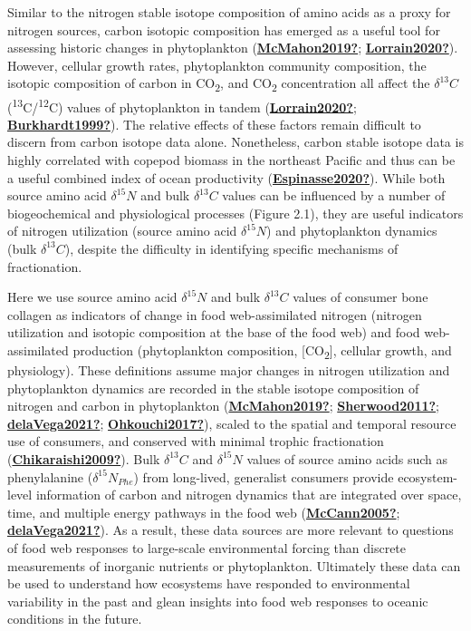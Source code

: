 \documentclass [11pt, proquest] {uwthesis}[2015/03/03]
\begin{document}
Similar to the nitrogen stable isotope composition of amino acids as a proxy for nitrogen sources, carbon isotopic composition has emerged as a useful tool for assessing historic changes in phytoplankton (\protect\hyperlink{ref-McMahon2019}{\textbf{McMahon2019?}}; \protect\hyperlink{ref-Lorrain2020}{\textbf{Lorrain2020?}}). However, cellular growth rates, phytoplankton community composition, the isotopic composition of carbon in CO\textsubscript{2}, and CO\textsubscript{2} concentration all affect the \(\delta^{13}C\) (\textsuperscript{13}C/\textsuperscript{12}C) values of phytoplankton in tandem (\protect\hyperlink{ref-Lorrain2020}{\textbf{Lorrain2020?}}; \protect\hyperlink{ref-Burkhardt1999}{\textbf{Burkhardt1999?}}). The relative effects of these factors remain difficult to discern from carbon isotope data alone. Nonetheless, carbon stable isotope data is highly correlated with copepod biomass in the northeast Pacific and thus can be a useful combined index of ocean productivity (\protect\hyperlink{ref-Espinasse2020}{\textbf{Espinasse2020?}}). While both source amino acid \(\delta^{15}N\) and bulk \(\delta^{13}C\) values can be influenced by a number of biogeochemical and physiological processes (Figure 2.1), they are useful indicators of nitrogen utilization (source amino acid \(\delta^{15}N\)) and phytoplankton dynamics (bulk \(\delta^{13}C\)), despite the difficulty in identifying specific mechanisms of fractionation.

Here we use source amino acid \(\delta^{15}N\) and bulk \(\delta^{13}C\) values of consumer bone collagen as indicators of change in food web-assimilated nitrogen (nitrogen utilization and isotopic composition at the base of the food web) and food web-assimilated production (phytoplankton composition, {[}CO\textsubscript{2}{]}, cellular growth, and physiology). These definitions assume major changes in nitrogen utilization and phytoplankton dynamics are recorded in the stable isotope composition of nitrogen and carbon in phytoplankton (\protect\hyperlink{ref-McMahon2019}{\textbf{McMahon2019?}}; \protect\hyperlink{ref-Sherwood2011}{\textbf{Sherwood2011?}}; \protect\hyperlink{ref-delaVega2021}{\textbf{delaVega2021?}}; \protect\hyperlink{ref-Ohkouchi2017}{\textbf{Ohkouchi2017?}}), scaled to the spatial and temporal resource use of consumers, and conserved with minimal trophic fractionation (\protect\hyperlink{ref-Chikaraishi2009}{\textbf{Chikaraishi2009?}}). Bulk \(\delta^{13}C\) and \(\delta^{15}N\) values of source amino acids such as phenylalanine (\(\delta^{15}N_{Phe}\)) from long-lived, generalist consumers provide ecosystem-level information of carbon and nitrogen dynamics that are integrated over space, time, and multiple energy pathways in the food web (\protect\hyperlink{ref-McCann2005}{\textbf{McCann2005?}}; \protect\hyperlink{ref-delaVega2021}{\textbf{delaVega2021?}}). As a result, these data sources are more relevant to questions of food web responses to large-scale environmental forcing than discrete measurements of inorganic nutrients or phytoplankton. Ultimately these data can be used to understand how ecosystems have responded to environmental variability in the past and glean insights into food web responses to oceanic conditions in the future.
\end{document}
